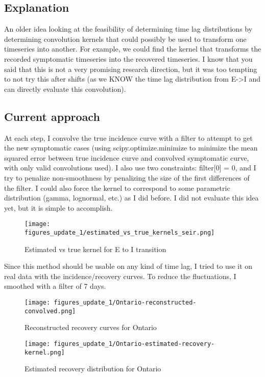 \documentclass{article}
\begin{document}
\subsection{Explanation}
An older idea looking at the feasibility of determining time lag distributions by determining convolution kernels that could possibly be used to transform one timeseries into another. For example, we could find the kernel that transforms the recorded symptomatic timeseries into the recovered timeseries. I know that you said that this is not a very promising research direction, but it was too tempting to not try this after shifts (as we KNOW the time lag distribution from E->I and can directly evaluate this convolution). 

\subsection{Current approach}
At each step, I convolve the true incidence curve with a filter to attempt to get the new symptomatic cases (using scipy.optimize.minimize to minimize the mean squared error between true incidence curve and convolved symptomatic curve, with only valid convolutions used).
I also use two constraints: filter[0] = 0, and I try to penalize non-smoothness by penalizing the size of the first differences of the filter.
I could also force the kernel to correspond to some parametric distribution (gamma, lognormal, etc.) as I did before. I did not evaluate this idea yet, but it is simple to accomplish. 

\clearpage
\begin{figure}[h!]
    \centering
    \texttt{[image: figures\_update\_1/estimated\_vs\_true\_kernels\_seir.png]}
    \caption{Estimated vs true kernel for E to I transition}
    \label{fig:my_label}
\end{figure}

Since this method should be usable on any kind of time lag, I tried to use it on real data with the incidence/recovery curves. To reduce the fluctuations, I smoothed with a filter of 7 days.

\begin{figure}[h!]
    \centering
    \texttt{[image: figures\_update\_1/Ontario-reconstructed-convolved.png]}
    \caption{Reconstructed recovery curves for Ontario}
    \label{fig:my_label}
\end{figure}

\begin{figure}[h!]
    \centering
    \texttt{[image: figures\_update\_1/Ontario-estimated-recovery-kernel.png]}
    \caption{Estimated recovery distribution for Ontario}
    \label{fig:my_label}
\end{figure}
\end{document}
